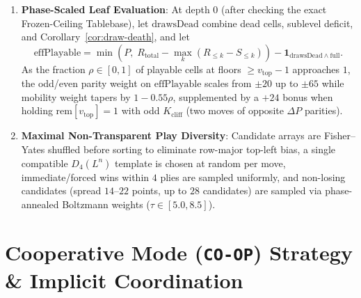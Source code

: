 \documentclass[10pt,a4paper]{article}
\theoremstyle{remark}
\begin{document}
\begin{enumerate}[nosep]
\begin{itemize}[nosep]
  \end{itemize}
  \item \textbf{Phase-Scaled Leaf Evaluation}: At depth $0$ (after checking the exact Frozen-Ceiling Tablebase), let $\mathrm{drawsDead}$ combine dead cells, sublevel deficit, and Corollary~\ref{cor:draw-death}, and let
  \[
    \mathrm{effPlayable} = \min(P,\; R_{\mathrm{total}} - \max_k(R_{\le k} - S_{\le k})) - \mathbf{1}_{\mathrm{drawsDead} \land \text{full}}.
  \]
  As the fraction $\rho \in [0,1]$ of playable cells at floors $\ge v_{\mathrm{top}}-1$ approaches $1$, the odd/even parity weight on $\mathrm{effPlayable}$ scales from $\pm 20$ up to $\pm 65$ while mobility weight tapers by $1 - 0.55\rho$, supplemented by a $+24$ bonus when holding $\mathrm{rem}[v_{\mathrm{top}}]=1$ with odd $K_{\mathrm{cliff}}$ (two moves of opposite $\Delta P$ parities).
  \item \textbf{Maximal Non-Transparent Play Diversity}: Candidate arrays are Fisher--Yates shuffled before sorting to eliminate row-major top-left bias, a single compatible $D_4(L^n)$ template is chosen at random per move, immediate/forced wins within $4$ plies are sampled uniformly, and non-losing candidates (spread $14\text{--}22$ points, up to $28$ candidates) are sampled via phase-annealed Boltzmann weights ($\tau \in [5.0, 8.5]$).
\end{enumerate}

\section{\texorpdfstring{Cooperative Mode (\texttt{CO-OP}) Strategy \& Implicit Coordination}{Cooperative Mode (CO-OP) Strategy and Implicit Coordination}}
\end{document}
